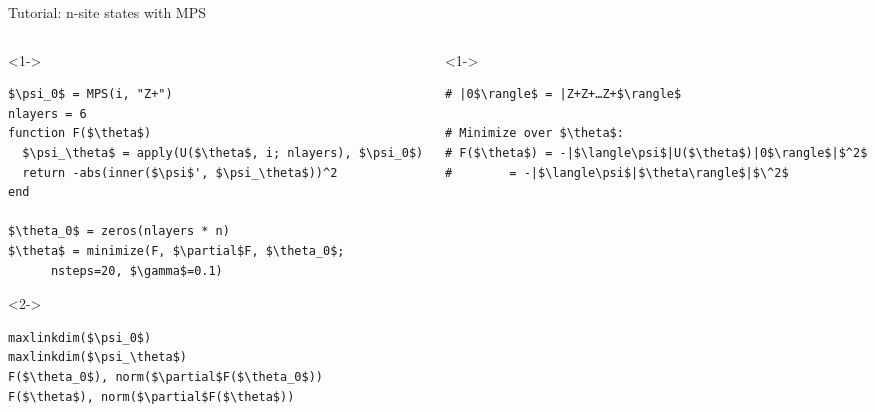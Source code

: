 \begin{frame}[fragile]{Tutorial: n-site states with MPS}


\begin{columns}

\begin{column}{5.5cm}

\begin{onlyenv}<1->


\begin{lstlisting}[language=JuliaLocal, style=julia, mathescape, basicstyle=\small]
$\psi_0$ = MPS(i, "Z+")
nlayers = 6
function F($\theta$)
  $\psi_\theta$ = apply(U($\theta$, i; nlayers), $\psi_0$)
  return -abs(inner($\psi$', $\psi_\theta$))^2
end

$\theta_0$ = zeros(nlayers * n)
$\theta$ = minimize(F, $\partial$F, $\theta_0$;
      nsteps=20, $\gamma$=0.1)
\end{lstlisting}

\end{onlyenv}

\begin{onlyenv}<2->

\begin{lstlisting}[language=JuliaLocal, style=julia, mathescape, basicstyle=\small]
maxlinkdim($\psi_0$)
maxlinkdim($\psi_\theta$)
F($\theta_0$), norm($\partial$F($\theta_0$))
F($\theta$), norm($\partial$F($\theta$))
\end{lstlisting}

\end{onlyenv}

\end{column}

\begin{column}{4.5cm}

\begin{onlyenv}<1->

\begin{lstlisting}[style=julia, numbers=none, mathescape, basicstyle=\small]
# |0$\rangle$ = |Z+Z+…Z+$\rangle$

# Minimize over $\theta$:
# F($\theta$) = -|$\langle\psi$|U($\theta$)|0$\rangle$|$^2$
#        = -|$\langle\psi$|$\theta\rangle$|$\^2$





\end{lstlisting}
\end{onlyenv}
\end{column}
\end{columns}
\end{frame}
